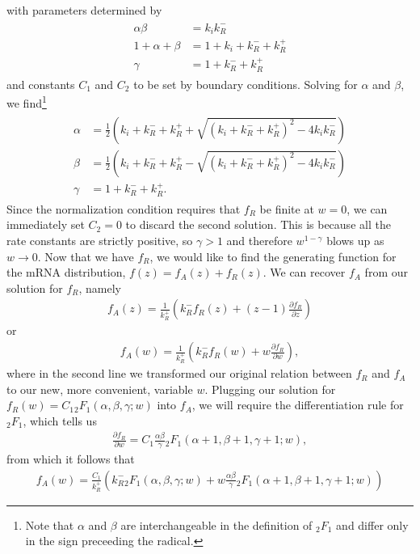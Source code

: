 \documentclass[12pt]{article}%
\newcommand{\pderiv}[2][{}]{\frac{\partial #1}{\partial #2}}
\begin{document}
with parameters determined by
\begin{align}
\begin{split}
\alpha\beta &= k_i k_R^-
\\
1+\alpha+\beta &= 1+k_i+k_R^-+k_R^+
\\
\gamma &= 1 + k_R^- + k_R^+
\end{split}
\end{align}
and constants $C_1$ and $C_2$ to be set by boundary conditions.
Solving for $\alpha$ and $\beta$, we find\footnote{
Note that $\alpha$ and $\beta$ are interchangeable in the definition of
${_2F_1}$ and differ only in the sign preceeding the radical.
}
\begin{align}
\begin{split}
\alpha &= \frac{1}{2}
\left(k_i+k_R^-+k_R^+ + \sqrt{(k_i+k_R^-+k_R^+)^2 - 4k_i k_R^-}\right)
\\
\beta &= \frac{1}{2}
\left(k_i+k_R^-+k_R^+ - \sqrt{(k_i+k_R^-+k_R^+)^2 - 4k_i k_R^-}\right)
\\
\gamma &= 1 + k_R^- + k_R^+.
\end{split}
\end{align}
Since the normalization condition requires that $f_R$ be finite at $w=0$,
we can immediately set $C_2=0$ to discard the second solution.
This is because all the rate constants are strictly positive,
so $\gamma>1$ and therefore $w^{1-\gamma}$ blows up as $w\rightarrow0$.
Now that we have $f_R$, we would like to find the generating function
for the mRNA distribution, $f(z) = f_A(z) + f_R(z)$.
We can recover $f_A$ from our solution for $f_R$, namely
\begin{align}
f_A(z) = \frac{1}{k_R^+}\left(k_R^- f_R(z) + (z-1) \pderiv[f_R]{z}\right)
\end{align}
or
\begin{align}
f_A(w) = \frac{1}{k_R^+}\left(k_R^- f_R(w) + w \pderiv[f_R]{w}\right),
\end{align}
where in the second line we transformed our original relation between
$f_R$ and $f_A$ to our new, more convenient, variable $w$.
Plugging our solution for $f_R(w) = C_1{_2F_1}(\alpha, \beta, \gamma; w)$
into $f_A$, we will require the differentiation rule for ${_2F_1}$,
which tells us
\begin{align}
\pderiv[f_R]{w} = C_1\frac{\alpha\beta}{\gamma}
                {_2F_1}(\alpha+1, \beta+1, \gamma+1; w),
\end{align}
from which it follows that
\begin{align}
f_A(w) = \frac{C_1}{k_R^+}
\left(
k_R^- {_2F_1}(\alpha, \beta, \gamma; w)
+ w\frac{\alpha\beta}{\gamma} {_2F_1}(\alpha+1, \beta+1, \gamma+1; w)
\right)
\end{align}
\end{document}

